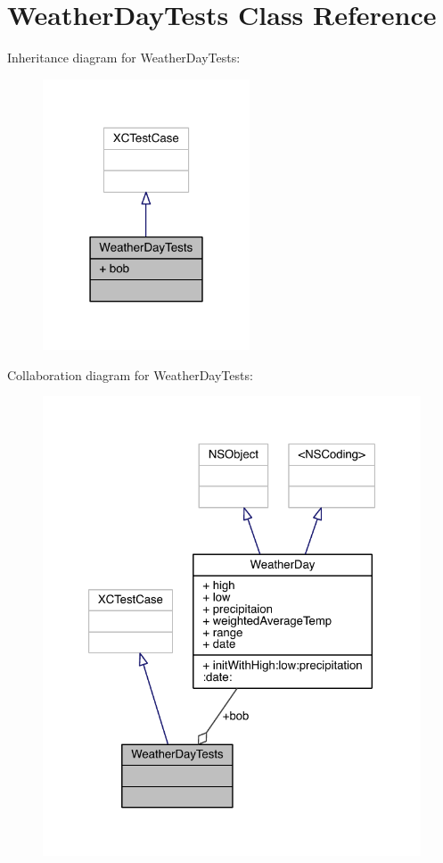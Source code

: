 \hypertarget{interface_weather_day_tests}{\section{Weather\-Day\-Tests Class Reference}
\label{interface_weather_day_tests}
}


Inheritance diagram for Weather\-Day\-Tests\-:\nopagebreak
\begin{figure}[H]
\begin{center}
\leavevmode
\includegraphics[width=174pt]{interface_weather_day_tests__inherit__graph}
\end{center}
\end{figure}


Collaboration diagram for Weather\-Day\-Tests\-:
\nopagebreak
\begin{figure}[H]
\begin{center}
\leavevmode
\includegraphics[width=323pt]{interface_weather_day_tests__coll__graph}
\end{center}
\end{figure}
